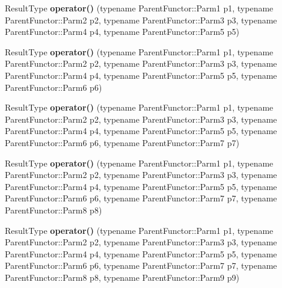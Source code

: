 \begin{DoxyCompactItemize}
\item 
\hypertarget{classutilspp_1_1MemFunHandler_ae76b4e3bf6dc4a815179231c8f0b70cd}{Result\-Type {\bfseries operator()} (typename Parent\-Functor\-::\-Parm1 p1, typename Parent\-Functor\-::\-Parm2 p2, typename Parent\-Functor\-::\-Parm3 p3, typename Parent\-Functor\-::\-Parm4 p4, typename Parent\-Functor\-::\-Parm5 p5)}\label{classutilspp_1_1MemFunHandler_ae76b4e3bf6dc4a815179231c8f0b70cd}

\item 
\hypertarget{classutilspp_1_1MemFunHandler_a1540e37366aaa428869451532b819971}{Result\-Type {\bfseries operator()} (typename Parent\-Functor\-::\-Parm1 p1, typename Parent\-Functor\-::\-Parm2 p2, typename Parent\-Functor\-::\-Parm3 p3, typename Parent\-Functor\-::\-Parm4 p4, typename Parent\-Functor\-::\-Parm5 p5, typename Parent\-Functor\-::\-Parm6 p6)}\label{classutilspp_1_1MemFunHandler_a1540e37366aaa428869451532b819971}

\item 
\hypertarget{classutilspp_1_1MemFunHandler_aa26f6d4e6be732782818f23d36912a54}{Result\-Type {\bfseries operator()} (typename Parent\-Functor\-::\-Parm1 p1, typename Parent\-Functor\-::\-Parm2 p2, typename Parent\-Functor\-::\-Parm3 p3, typename Parent\-Functor\-::\-Parm4 p4, typename Parent\-Functor\-::\-Parm5 p5, typename Parent\-Functor\-::\-Parm6 p6, typename Parent\-Functor\-::\-Parm7 p7)}\label{classutilspp_1_1MemFunHandler_aa26f6d4e6be732782818f23d36912a54}

\item 
\hypertarget{classutilspp_1_1MemFunHandler_a185553e62b208dd762a3d3dd69fd9091}{Result\-Type {\bfseries operator()} (typename Parent\-Functor\-::\-Parm1 p1, typename Parent\-Functor\-::\-Parm2 p2, typename Parent\-Functor\-::\-Parm3 p3, typename Parent\-Functor\-::\-Parm4 p4, typename Parent\-Functor\-::\-Parm5 p5, typename Parent\-Functor\-::\-Parm6 p6, typename Parent\-Functor\-::\-Parm7 p7, typename Parent\-Functor\-::\-Parm8 p8)}\label{classutilspp_1_1MemFunHandler_a185553e62b208dd762a3d3dd69fd9091}

\item 
\hypertarget{classutilspp_1_1MemFunHandler_a70e1fd45d73d92f9e151fc673c0b8612}{Result\-Type {\bfseries operator()} (typename Parent\-Functor\-::\-Parm1 p1, typename Parent\-Functor\-::\-Parm2 p2, typename Parent\-Functor\-::\-Parm3 p3, typename Parent\-Functor\-::\-Parm4 p4, typename Parent\-Functor\-::\-Parm5 p5, typename Parent\-Functor\-::\-Parm6 p6, typename Parent\-Functor\-::\-Parm7 p7, typename Parent\-Functor\-::\-Parm8 p8, typename Parent\-Functor\-::\-Parm9 p9)}\label{classutilspp_1_1MemFunHandler_a70e1fd45d73d92f9e151fc673c0b8612}


\end{DoxyCompactItemize}
